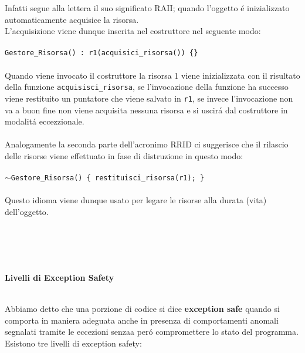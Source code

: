 \documentclass{article}
\newcommand\TILDE{$\sim$}
\begin{document}
Infatti segue alla lettera il suo significato RAII; quando l'oggetto \'e inizializzato automaticamente acquisice la risorsa. \\L'acquisizione viene dunque inserita nel costruttore nel seguente modo: \\ \\ 
\texttt{Gestore\_Risorsa() : r1(acquisici\_risorsa()) \{\}} \\ \\
Quando viene invocato il costruttore la risorsa 1 viene inizializzata con il risultato della funzione \texttt{acquisisci\_risorsa}, se l'invocazione della funzione ha successo viene restituito un puntatore che viene salvato in \texttt{r1}, se invece l'invocazione non va a buon fine non viene acquisita nessuna risorsa e si uscir\'a dal costruttore in modalit\'a eccezzionale.\\
\\Analogamente la seconda parte dell'acronimo RRID ci suggerisce che il rilascio delle risorse viene effettuato in fase di distruzione in questo modo:
\\ \\ \texttt{\TILDE Gestore\_Risorsa() \{ restituisci\_risorsa(r1); \} } \\
\\Questo idioma viene dunque usato per legare le risorse alla durata (vita) dell'oggetto.
\\ \\ \\ \\ \\
\begin{large}\textbf{\textcolor{blu}{Livelli di Exception Safety}} \\ \\ \end{large}
Abbiamo detto che una porzione di codice si dice \textbf{exception safe} quando si comporta in maniera adeguata anche in presenza di comportamenti anomali segnalati tramite le eccezioni senzaa per\'o compromettere lo stato del programma. \\Esistono tre livelli di exception safety: \\
\end{document}
